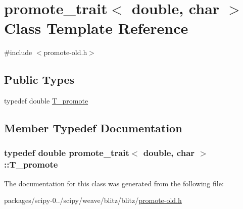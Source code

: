 \hypertarget{classpromote__trait_3_01double_00_01char_01_4}{}\section{promote\+\_\+trait$<$ double, char $>$ Class Template Reference}
\label{classpromote__trait_3_01double_00_01char_01_4}


{\ttfamily \#include $<$promote-\/old.\+h$>$}

\subsection*{Public Types}
\begin{DoxyCompactItemize}
\item 
typedef double \hyperlink{classpromote__trait_3_01double_00_01char_01_4_aa2d5fea7a6c6828bd7f09281b9e2adc7}{T\+\_\+promote}
\end{DoxyCompactItemize}


\subsection{Member Typedef Documentation}
\hypertarget{classpromote__trait_3_01double_00_01char_01_4_aa2d5fea7a6c6828bd7f09281b9e2adc7}{}
\subsubsection[{T\+\_\+promote}]{\setlength{\rightskip}{0pt plus 5cm}typedef double {\bf promote\+\_\+trait}$<$ double, char $>$\+::{\bf T\+\_\+promote}}\label{classpromote__trait_3_01double_00_01char_01_4_aa2d5fea7a6c6828bd7f09281b9e2adc7}


The documentation for this class was generated from the following file\+:\begin{DoxyCompactItemize}
\item 
packages/scipy-\/0../scipy/weave/blitz/blitz/\hyperlink{promote-old_8h}{promote-\/old.\+h}\end{DoxyCompactItemize}
